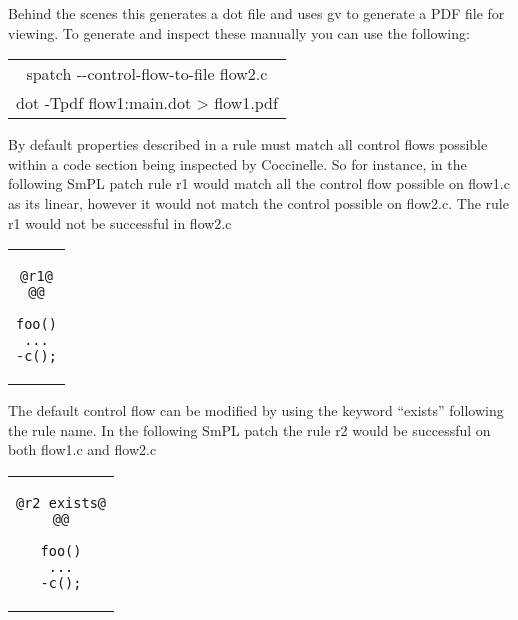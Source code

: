 

Behind the scenes this generates a dot file and uses gv to generate
a PDF file for viewing. To generate and inspect these manually you
can use the following:

\begin{center}
\begin{tabular}{c}
spatch -{}-control-flow-to-file flow2.c \\
dot -Tpdf flow1:main.dot > flow1.pdf
\end{tabular}
\end{center}

By default properties described in a rule must match all control
flows possible within a code section being inspected by Coccinelle.
So for instance, in the following SmPL patch rule r1 would match all
the control flow possible on flow1.c as its linear, however it would
not match the control possible on flow2.c. The rule r1 would not
be successful in flow2.c

\begin{center}
\begin{tabular}{c}
\begin{lstlisting}[language=Cocci]
@r1@
@@

foo()
...
-c();

\end{lstlisting}\\
\end{tabular}
\end{center}

The default control flow can be modified by using the keyword ``exists''
following the rule name. In the following SmPL patch the rule r2 would
be successful on both flow1.c and flow2.c

\begin{center}
\begin{tabular}{c}
\begin{lstlisting}[language=Cocci]
@r2 exists@
@@

foo()
...
-c();

\end{lstlisting}\\
\end{tabular}
\end{center}

